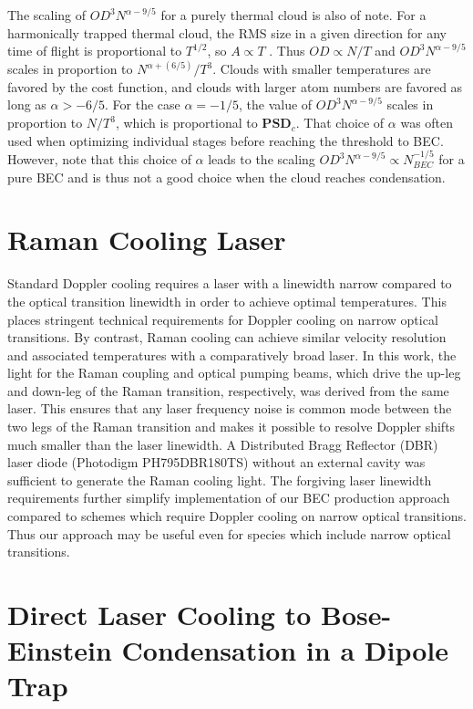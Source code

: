 \documentclass{article}
\begin{document}
The scaling of $OD^3 N^{\alpha-9/5}$ for a purely thermal cloud is also of note. For a harmonically trapped thermal cloud, the RMS size in a given direction for any time of flight is proportional to $T^{1/2}$, so $A \propto T$ . Thus $OD \propto N/T$ and $OD^3 N^{\alpha-9/5}$ scales in proportion to $N^{\alpha+(6/5)}/T^3$. Clouds with smaller temperatures are favored by the cost function, and clouds with larger atom numbers are favored as long as $\alpha > -6/5$. For the case $\alpha = -1/5$, the value of $OD^3 N^{\alpha-9/5}$ scales in proportion to $N/T^3$, which is proportional to $\mathbf{PSD}_c$. That choice of $\alpha$ was often used when optimizing individual stages before reaching the threshold to BEC. However, note that this choice of $\alpha$ leads to the scaling $OD^3 N^{\alpha-9/5} \propto N^{-1/5}_{BEC}$ for a pure BEC and is thus not a good choice when the cloud reaches condensation.

\section{Raman Cooling Laser}
Standard Doppler cooling requires a laser with a linewidth narrow compared to the optical transition linewidth in order to achieve optimal temperatures. This places stringent technical requirements for Doppler cooling on narrow optical transitions. By contrast, Raman cooling can achieve similar velocity resolution and associated temperatures with a comparatively broad laser. In this work, the light for the Raman coupling and optical pumping beams, which drive the up-leg and down-leg of the Raman transition, respectively, was derived from the same laser. This ensures that any laser frequency noise is common mode between the two legs of the Raman transition and makes it possible to resolve Doppler shifts much smaller than the laser linewidth. A Distributed Bragg Reflector (DBR) laser diode (Photodigm PH795DBR180TS) without an external cavity was sufficient to generate the Raman cooling light. The forgiving laser linewidth requirements further simplify implementation of our BEC production approach compared to schemes which require Doppler cooling on narrow optical transitions. Thus our approach may be useful even for species which include narrow optical transitions.

\section{Direct Laser Cooling to Bose-Einstein Condensation in a Dipole Trap}
\label{sec:Raman Cooling}
\end{document}
